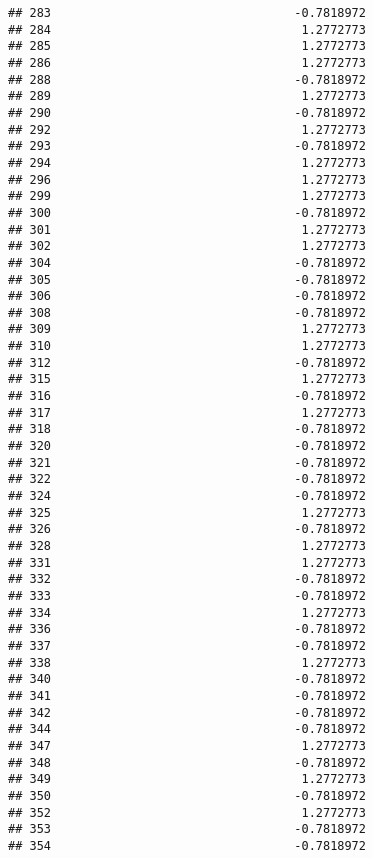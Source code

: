 \documentclass[
]{article}
\begin{document}
\begin{verbatim}
## 283                                  -0.7818972
## 284                                   1.2772773
## 285                                   1.2772773
## 286                                   1.2772773
## 288                                  -0.7818972
## 289                                   1.2772773
## 290                                  -0.7818972
## 292                                   1.2772773
## 293                                  -0.7818972
## 294                                   1.2772773
## 296                                   1.2772773
## 299                                   1.2772773
## 300                                  -0.7818972
## 301                                   1.2772773
## 302                                   1.2772773
## 304                                  -0.7818972
## 305                                  -0.7818972
## 306                                  -0.7818972
## 308                                  -0.7818972
## 309                                   1.2772773
## 310                                   1.2772773
## 312                                  -0.7818972
## 315                                   1.2772773
## 316                                  -0.7818972
## 317                                   1.2772773
## 318                                  -0.7818972
## 320                                  -0.7818972
## 321                                  -0.7818972
## 322                                  -0.7818972
## 324                                  -0.7818972
## 325                                   1.2772773
## 326                                  -0.7818972
## 328                                   1.2772773
## 331                                   1.2772773
## 332                                  -0.7818972
## 333                                  -0.7818972
## 334                                   1.2772773
## 336                                  -0.7818972
## 337                                  -0.7818972
## 338                                   1.2772773
## 340                                  -0.7818972
## 341                                  -0.7818972
## 342                                  -0.7818972
## 344                                  -0.7818972
## 347                                   1.2772773
## 348                                  -0.7818972
## 349                                   1.2772773
## 350                                  -0.7818972
## 352                                   1.2772773
## 353                                  -0.7818972
## 354                                  -0.7818972

\end{verbatim}
\end{document}
